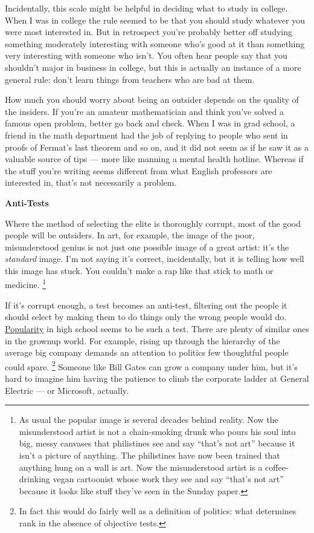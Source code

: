 Incidentally, this scale might be helpful in deciding what to study in
college. When I was in college the rule seemed to be that you should
study whatever you were most interested in. But in retrospect you're
probably better off studying something moderately interesting with
someone who's good at it than something very interesting with someone
who isn't. You often hear people say that you shouldn't major in
business in college, but this is actually an instance of a more general
rule: don't learn things from teachers who are bad at them.

How much you should worry about being an outsider depends on the quality
of the insiders. If you're an amateur mathematician and think you've
solved a famous open problem, better go back and check. When I was in
grad school, a friend in the math department had the job of replying to
people who sent in proofs of Fermat's last theorem and so on, and it did
not seem as if he saw it as a valuable source of tips --- more like
manning a mental health hotline. Whereas if the stuff you're writing
seems different from what English professors are interested in, that's
not necessarily a problem.

\textbf{Anti-Tests}

Where the method of selecting the elite is thoroughly corrupt, most of
the good people will be outsiders. In art, for example, the image of the
poor, misunderstood genius is not just one possible image of a great
artist: it's the \emph{standard} image. I'm not saying it's correct,
incidentally, but it is telling how well this image has stuck. You
couldn't make a rap like that stick to math or medicine.
\footnote{As usual the popular image is several decades behind reality.
Now the misunderstood artist is not a chain-smoking drunk who pours his
soul into big, messy canvases that philistines see and say ``that's not
art'' because it isn't a picture of anything. The philistines have now
been trained that anything hung on a wall is art. Now the misunderstood
artist is a coffee-drinking vegan cartoonist whose work they see and say
``that's not art'' because it looks like stuff they've seen in the
Sunday paper.}

If it's corrupt enough, a test becomes an anti-test, filtering out the
people it should select by making them to do things only the wrong
people would do. \href{nerds.html}{Popularity} in high school seems to
be such a test. There are plenty of similar ones in the grownup world.
For example, rising up through the hierarchy of the average big company
demands an attention to politics few thoughtful people could spare.
\footnote{In fact this would do fairly well as a definition of politics:
what determines rank in the absence of objective tests.} Someone like Bill Gates can grow a company under
him, but it's hard to imagine him having the patience to climb the
corporate ladder at General Electric --- or Microsoft, actually.

